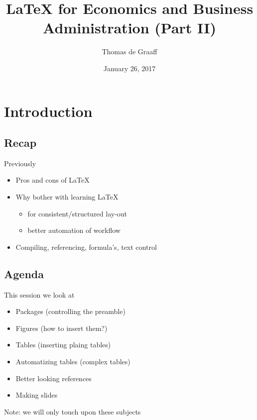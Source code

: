 \documentclass[ignorenonframetext]{beamer}
\title{\LaTeX{} for Economics and Business Administration (Part II)}
\author{Thomas de Graaff}
\date{January 26, 2017}
\begin{document}
\frame{\titlepage}

\section{Introduction}\label{introduction}

\subsection{Recap}\label{introduction-1}

\begin{frame}{Previously}
	\begin{itemize}
		\item Pros and cons of \LaTeX{}
		\newline
		\item Why bother with learning \LaTeX{}
		\begin{itemize}
			\item for consistent/structured lay-out
			\item better automation of workflow
			\newline
		\end{itemize}
		\item Compiling, referencing, formula's, text control
	\end{itemize}
\end{frame}

\subsection{Agenda}

\begin{frame}{This session we look at}
\begin{itemize}
	\item Packages (controlling the preamble)
	\newline
	\item Figures (how to insert them?)
	\newline
	\item Tables (inserting plaing tables)
	\newline
	\item Automatizing tables (complex tables)
	\newline
	\item Better looking references
	\newline
	\item Making slides
	\newline
\end{itemize}
	Note: we will only touch upon these subjects
\end{frame}
\end{document}
